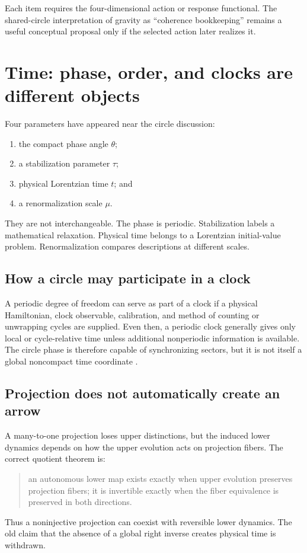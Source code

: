 \documentclass[11pt]{article}
\begin{document}
Each item requires the four-dimensional action or response functional. The
shared-circle interpretation of gravity as ``coherence bookkeeping'' remains
a useful conceptual proposal only if the selected action later realizes it.

\section{Time: phase, order, and clocks are different objects}

Four parameters have appeared near the circle discussion:
\begin{enumerate}
\item the compact phase angle \(\theta\);
\item a stabilization parameter \(\tau\);
\item physical Lorentzian time \(t\); and
\item a renormalization scale \(\mu\).
\end{enumerate}
They are not interchangeable. The phase is periodic. Stabilization labels a
mathematical relaxation. Physical time belongs to a Lorentzian initial-value
problem. Renormalization compares descriptions at different scales.

\subsection{How a circle may participate in a clock}

A periodic degree of freedom can serve as part of a clock if a physical
Hamiltonian, clock observable, calibration, and method of counting or
unwrapping cycles are supplied. Even then, a periodic clock generally gives
only local or cycle-relative time unless additional nonperiodic information
is available. The circle phase is therefore capable of synchronizing sectors,
but it is not itself a global noncompact time coordinate
\cite{QuantumClocks,PeriodicClocks}.

\subsection{Projection does not automatically create an arrow}

A many-to-one projection loses upper distinctions, but the induced lower
dynamics depends on how the upper evolution acts on projection fibers. The
correct quotient theorem is:
\begin{quote}
an autonomous lower map exists exactly when upper evolution preserves
projection fibers; it is invertible exactly when the fiber equivalence is
preserved in both directions.
\end{quote}
Thus a noninjective projection can coexist with reversible lower dynamics.
The old claim that the absence of a global right inverse creates physical
time is withdrawn.
\end{document}
